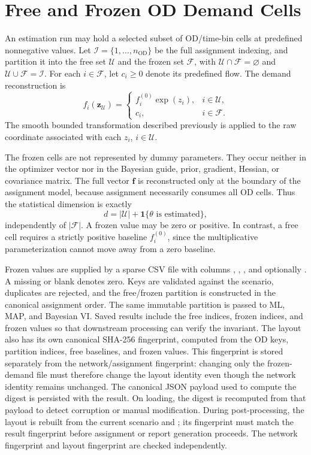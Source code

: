 \section{Free and Frozen OD Demand Cells}

An estimation run may hold a selected subset of OD/time-bin cells at predefined
nonnegative values. Let $\mathcal{I}=\{1,\ldots,n_{\mathrm{OD}}\}$ be the full
assignment indexing, and partition it into the free set $\mathcal{U}$ and the
frozen set $\mathcal{F}$, with
$\mathcal{U}\cap\mathcal{F}=\varnothing$ and
$\mathcal{U}\cup\mathcal{F}=\mathcal{I}$. For each $i\in\mathcal{F}$, let
$c_i\geq 0$ denote its predefined flow. The demand reconstruction is
\[
f_i(\bm z_{\mathcal U})=
\begin{cases}
f_i^{(0)}\exp(z_i), & i\in\mathcal{U},\\
c_i, & i\in\mathcal{F}.
\end{cases}
\]
The smooth bounded transformation described previously is applied to the raw
coordinate associated with each $z_i$, $i\in\mathcal U$.

The frozen cells are not represented by dummy parameters. They occur neither in
the optimizer vector nor in the Bayesian guide, prior, gradient, Hessian, or
covariance matrix. The full vector $\bm f$ is reconstructed only at the boundary
of the assignment model, because assignment necessarily consumes all OD cells.
Thus the statistical dimension is exactly
\[
d=|\mathcal U|+\mathbf{1}\{\theta\text{ is estimated}\},
\]
independently of $|\mathcal F|$. A frozen value may be zero or positive. In
contrast, a free cell requires a strictly positive baseline $f_i^{(0)}$, since
the multiplicative parameterization cannot move away from a zero baseline.

Frozen values are supplied by a sparse CSV file with columns
, , , and optionally
. A missing or blank  denotes zero. Keys are
validated against the scenario,
duplicates are rejected, and the free/frozen partition is constructed in the
canonical assignment order. The same immutable partition is passed to ML, MAP,
and Bayesian VI. Saved results include the free indices, frozen indices, and
frozen values so that downstream processing can verify the invariant.
The layout also has its own canonical SHA-256 fingerprint, computed from the OD
keys, partition indices, free baselines, and frozen values. This fingerprint is
stored separately from the network/assignment fingerprint: changing only the
frozen-demand file must therefore change the layout identity even though the
network identity remains unchanged. The canonical JSON payload used to compute
the digest is persisted with the result. On loading, the digest is recomputed
from that payload to detect corruption or manual modification. During
post-processing, the layout is rebuilt from the current scenario and
; its fingerprint must match the result fingerprint
before assignment or report generation proceeds. The network fingerprint and
layout fingerprint are checked independently.

